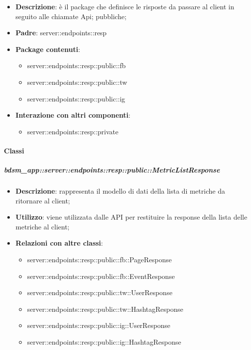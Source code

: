 \begin{itemize}
  \item \textbf{Descrizione}: è il package che definisce le risposte da passare al client in seguito alle chiamate Api; pubbliche;
  \item \textbf{Padre}: server::endpoints::resp
  \item \textbf{Package contenuti}:
  	\begin{itemize}
  		\item server::endpoints::resp::public::fb
  		\item server::endpoints::resp::public::tw
  		\item server::endpoints::resp::public::ig
	\end{itemize}
  \item \textbf{Interazione con altri componenti}:
  	\begin{itemize}
  		\item server::endpoints::resp::private
	\end{itemize}
\end{itemize}

	\paragraph{Classi} %

    \subparagraph{bdsm\_app::server::endpoints::resp::public::MetricListResponse} %
    \label{subp:bdsm_app_server_endpoints_resp_public_metriclistresponse}
    \begin{itemize}
      \item \textbf{Descrizione}: rappresenta il modello di dati della lista di metriche da ritornare al client;
      \item \textbf{Utilizzo}: viene utilizzata dalle API per restituire la response della lista delle metriche al client;
      \item \textbf{Relazioni con altre classi}:
        \begin{itemize}
          \item server::endpoints::resp::public::fb::PageResponse
          \item server::endpoints::resp::public::fb::EventResponse
          \item server::endpoints::resp::public::tw::UserResponse
          \item server::endpoints::resp::public::tw::HashtagResponse
          \item server::endpoints::resp::public::ig::UserResponse
          \item server::endpoints::resp::public::ig::HashtagResponse
        \end{itemize}
      \end{itemize}


